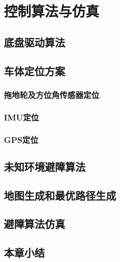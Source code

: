

\chapter{控制算法与仿真}
\label{chap:algorithmAndSimulation}

\section{底盘驱动算法}
\section{车体定位方案}
\subsection{拖地轮及方位角传感器定位}
\subsection{IMU定位}
\subsection{GPS定位}
\section{未知环境避障算法}
\section{地图生成和最优路径生成}
\section{避障算法仿真}
\section{本章小结}
